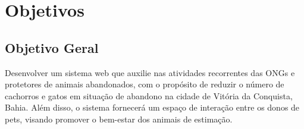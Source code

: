     



\section{Objetivos}
\label{sec:Objetivos}
\subsection{Objetivo Geral}
\label{subsec:ObjetivoGeral}

Desenvolver um sistema web que auxilie nas atividades recorrentes das ONGs e protetores de animais abandonados, com o propósito de reduzir o número de cachorros e gatos em situação de abandono na cidade de Vitória da Conquista, Bahia. Além disso, o sistema fornecerá um espaço de interação entre os donos de pets, visando promover o bem-estar dos animais de estimação.

